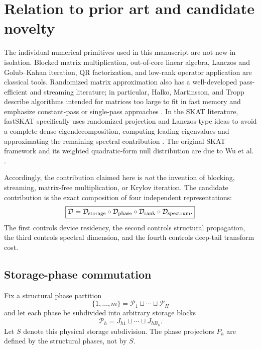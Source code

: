 \documentclass[11pt]{article}
\theoremstyle{definition}
\theoremstyle{remark}
\begin{document}
\section{Relation to prior art and candidate novelty}

The individual numerical primitives used in this manuscript are not new in
isolation.  Blocked matrix multiplication, out-of-core linear algebra,
Lanczos and Golub--Kahan iteration, QR factorization, and low-rank operator
application are classical tools.  Randomized matrix approximation also has a
well-developed pass-efficient and streaming literature; in particular,
Halko, Martinsson, and Tropp describe algorithms intended for matrices too
large to fit in fast memory and emphasize constant-pass or single-pass
approaches \cite{Halko2011}.  In the SKAT literature, fastSKAT specifically
uses randomized projection and Lanczos-type ideas to avoid a complete dense
eigendecomposition, computing leading eigenvalues and approximating the
remaining spectral contribution \cite{Lumley2018}.  The original SKAT
framework and its weighted quadratic-form null distribution are due to Wu
et al. \cite{Wu2011}.

Accordingly, the contribution claimed here is \emph{not} the invention of
blocking, streaming, matrix-free multiplication, or Krylov iteration.  The
candidate contribution is the exact composition of four independent
representations:
\[
\boxed{
\mathcal D
=
\mathcal D_{\rm storage}
\circ
\mathcal D_{\rm phase}
\circ
\mathcal D_{\rm rank}
\circ
\mathcal D_{\rm spectrum}.
}
\]
The first controls device residency, the second controls structural
propagation, the third controls spectral dimension, and the fourth controls
deep-tail transform cost.

\subsection{Storage-phase commutation}

Fix a structural phase partition
\[
\{1,\ldots,m\}=\mathcal P_1\sqcup\cdots\sqcup\mathcal P_H
\]
and let each phase be subdivided into arbitrary storage blocks
\[
\mathcal P_h
=
J_{h1}\sqcup\cdots\sqcup J_{hB_h}.
\]
Let $S$ denote this physical storage subdivision.  The phase projectors
$P_h$ are defined by the structural phases, not by $S$.
\end{document}
